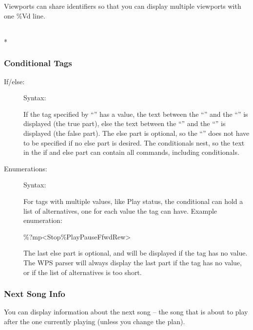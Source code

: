{Viewports can share identifiers so that you can display multiple viewports
with one \%Vd line.

\\*

}

\subsubsection{Conditional Tags}

\begin{description}
\item[If/else: ]
Syntax: 

If the tag specified by ``'' has a value, the text between the 
``\config{{\textless}}'' and the ``\config{{\textbar}}'' is displayed (the true
part), else the text between the ``\config{{\textbar}}'' and the 
``\config{{\textgreater}}'' is displayed (the false part).
The else part is optional, so the ``\config{{\textbar}}'' does not have to be 
specified if no else part is desired. The conditionals nest, so the text in the
if and else part can contain all \config{\%} commands, including conditionals.

\item[Enumerations: ]
Syntax: 

For tags with multiple values, like Play status, the conditional can hold a 
list of alternatives, one for each value the tag can have.
Example enumeration: 
\begin{example}
     \%?mp{\textless}Stop{\textbar}\%Play{\textbar}Pause{\textbar}Ffwd{\textbar}Rew{\textgreater}
\end{example}

The last else part is optional, and will be displayed if the tag has no value. 
The WPS parser will always display the last part if the tag has no value, or if
the list of alternatives is too short.
\end{description}

\subsubsection{Next Song Info}
You can display information about the next song -- the song that is
about to play after the one currently playing (unless you change the
plan).

